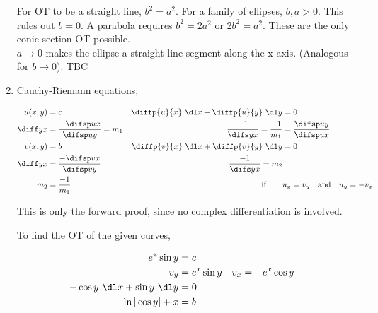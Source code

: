 \begin{enumerate}
          For OT to be a straight line, $ b^{2} = a^{2} $. For a family of ellipses,
          $ b, a > 0 $.
          This rules out $ b = 0 $. A parabola requires
          $ b^{2} = 2a^{2} $ or $ 2b^{2} = a^{2} $. These are the only conic section
          OT possible.\\
          $ a \to 0 $ makes the ellipse a straight line segment along the x-axis.
          (Analogous for $ b \to 0 $). TBC

    \item Cauchy-Riemann equations,

          \begin{align}
              u(x, y)            & = c                                    &
              \diffp{u}{x}\ \dl x + \diffp{u}{y}
              \ \dl y            & = 0                                      \\
              \diff yx           & = \frac{-\difsp ux}{\difsp uy} = m_{1} &
              \frac{-1}{\difs yx}
              = \frac{-1}{m_{1}} & = \frac{\difsp uy}{\difsp ux}            \\
              v(x, y)            & = b                                    &
              \diffp{v}{x}\ \dl x + \diffp{v}{y}
              \ \dl y            & = 0                                      \\
              \diff yx           & = \frac{-\difsp vx}{\difsp vy}         &
              \frac{-1}{\difs yx} = m_{2}                                   \\
              m_{2}              & = \frac{-1}{m_{1}}                     &
              \text{if} \qquad   & u_{x} = v_{y} \quad \text{and}
              \quad u_{y} = -v_{x}
          \end{align}

          This is only the forward proof, since no complex differentiation is involved.
          \par
          To find the OT of the given curves,

          \begin{align}
              e^{x}\sin y                    & = c                                    \\
              v_{y}                          & = e^{x}\sin y & v_{x} & = -e^{x}\cos y \\
              -\cos y\ \dl x + \sin y\ \dl y & = 0                                    \\
              \ln |\cos y| + x               & = b
          \end{align}



\end{enumerate}
